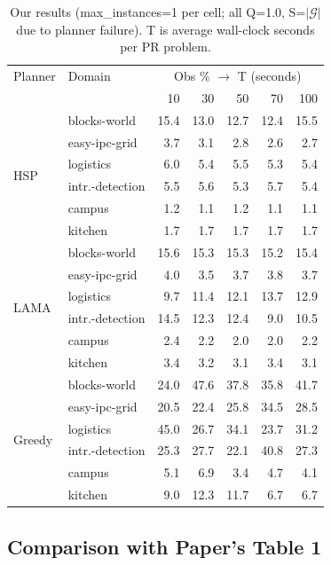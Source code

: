 \documentclass[10pt,twocolumn]{article}
\begin{document}
\begin{table}[H]
\centering
\caption{Our results (max\_instances=1 per cell; all Q=1.0, S=$|\mathcal{G}|$ due to planner failure). T is average wall-clock seconds per PR problem.}
\label{tab:our-results}
\small
\begin{tabular}{llrrrrr}
\toprule
Planner & Domain & \multicolumn{5}{c}{Obs \% $\rightarrow$ T (seconds)} \\
 & & 10 & 30 & 50 & 70 & 100 \\
\midrule
\multirow{6}{*}{HSP}
  & blocks-world       & 15.4 & 13.0 & 12.7 & 12.4 & 15.5 \\
  & easy-ipc-grid      & 3.7  & 3.1  & 2.8  & 2.6  & 2.7 \\
  & logistics          & 6.0  & 5.4  & 5.5  & 5.3  & 5.4 \\
  & intr.-detection    & 5.5  & 5.6  & 5.3  & 5.7  & 5.4 \\
  & campus             & 1.2  & 1.1  & 1.2  & 1.1  & 1.1 \\
  & kitchen            & 1.7  & 1.7  & 1.7  & 1.7  & 1.7 \\
\midrule
\multirow{6}{*}{LAMA}
  & blocks-world       & 15.6 & 15.3 & 15.3 & 15.2 & 15.4 \\
  & easy-ipc-grid      & 4.0  & 3.5  & 3.7  & 3.8  & 3.7 \\
  & logistics          & 9.7  & 11.4 & 12.1 & 13.7 & 12.9 \\
  & intr.-detection    & 14.5 & 12.3 & 12.4 & 9.0  & 10.5 \\
  & campus             & 2.4  & 2.2  & 2.0  & 2.0  & 2.2 \\
  & kitchen            & 3.4  & 3.2  & 3.1  & 3.4  & 3.1 \\
\midrule
\multirow{6}{*}{Greedy}
  & blocks-world       & 24.0 & 47.6 & 37.8 & 35.8 & 41.7 \\
  & easy-ipc-grid      & 20.5 & 22.4 & 25.8 & 34.5 & 28.5 \\
  & logistics          & 45.0 & 26.7 & 34.1 & 23.7 & 31.2 \\
  & intr.-detection    & 25.3 & 27.7 & 22.1 & 40.8 & 27.3 \\
  & campus             & 5.1  & 6.9  & 3.4  & 4.7  & 4.1 \\
  & kitchen            & 9.0  & 12.3 & 11.7 & 6.7  & 6.7 \\
\bottomrule
\end{tabular}
\end{table}

\subsection{Comparison with Paper's Table 1}
\end{document}
